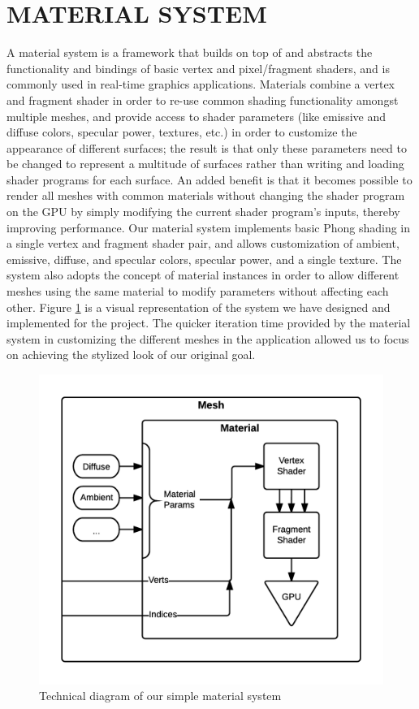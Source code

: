 \documentclass[a4paper,twoside]{article}
\begin{document}
\section{\uppercase{Material System}}
\label{sec:mat_sys}
\noindent A material system is a framework that builds on top of and abstracts the functionality and bindings of basic vertex and pixel/fragment shaders, and is commonly used in real-time graphics applications. Materials combine a vertex and fragment shader in order to re-use common shading functionality amongst multiple meshes, and provide access to shader parameters (like emissive and diffuse colors, specular power, textures, etc.) in order to customize the appearance of different surfaces; the result is that only these parameters need to be changed to represent a multitude of surfaces rather than writing and loading shader programs for each surface. An added benefit is that it becomes possible to render all meshes with common materials without changing the shader program on the GPU by simply modifying the current shader program's inputs, thereby improving performance.
Our material system implements basic Phong shading in a single vertex and fragment shader pair, and allows customization of ambient, emissive, diffuse, and specular colors, specular power, and a single texture. The system also adopts the concept of material instances in order to allow different meshes using the same material to modify parameters without affecting each other. Figure \ref{fig_ms} is a visual representation of the system we have designed and implemented for the project. The quicker iteration time provided by the material system in customizing the different meshes in the application allowed us to focus on achieving the stylized look of our original goal.

\begin{figure}
\includegraphics[scale=0.75]{./images/materials/ms_overview.png}
\caption{Technical diagram of our simple material system}
\label{fig_ms}
\end{figure}
\end{document}
